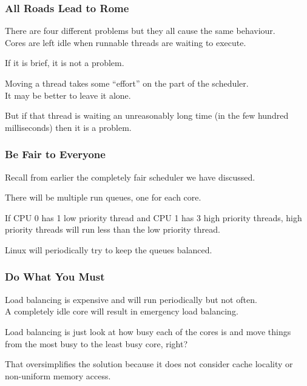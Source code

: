 \begin{frame}
\frametitle{All Roads Lead to Rome}

There are four different problems but they all cause the same behaviour. \\
\quad Cores are left idle when runnable threads are waiting to execute. 

If it is brief, it is not a problem.

Moving a thread takes some ``effort'' on the part of the scheduler.\\
\quad It may be better to leave it alone. 

But if that thread is waiting an unreasonably long time (in the few hundred milliseconds) then it is a problem.

\end{frame}



\begin{frame}
\frametitle{Be Fair to Everyone}

Recall from earlier the completely fair scheduler we have discussed. 

There will be multiple run queues, one for each core. 

If CPU 0 has 1 low priority thread and CPU 1 has 3 high priority threads, high priority threads will run less than the low priority thread. 

Linux will periodically try to keep the queues balanced.

\end{frame}



\begin{frame}
\frametitle{Do What You Must}

Load balancing is expensive and will run periodically but not often.\\
\quad A completely idle core will result in emergency load balancing.

Load balancing is just look at how busy each of the cores is and move things from the most busy to the least busy core, right?

That oversimplifies the solution because it does not consider cache locality or non-uniform memory access.

\end{frame}



